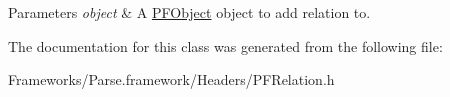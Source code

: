 \begin{DoxyParams}{Parameters}
{\em object} & A {\ttfamily \hyperlink{interface_p_f_object}{P\+F\+Object}} object to add relation to. \\
\hline
\end{DoxyParams}


The documentation for this class was generated from the following file\+:\begin{DoxyCompactItemize}
\item 
Frameworks/\+Parse.\+framework/\+Headers/P\+F\+Relation.\+h\end{DoxyCompactItemize}
